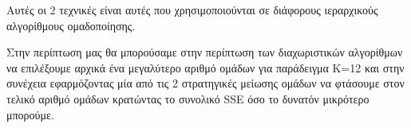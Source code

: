 \begin{enumerate}
        Αυτές οι 2 τεχνικές είναι αυτές που χρησιμοποιούνται σε διάφορους ιεραρχικούς αλγορίθμους ομαδοποίησης. 
        
        Στην περίπτωση μας θα μπορούσαμε στην περίπτωση των διαχωριστικών αλγορίθμων να επιλέξουμε αρχικά ένα μεγαλύτερο αριθμό ομάδων για παράδειγμα Κ=12 και στην συνέχεια εφαρμόζοντας μία από τις 2 στρατηγικές μείωσης ομάδων να φτάσουμε στον τελικό αριθμό ομάδων κρατώντας το συνολικό SSE όσο το δυνατόν μικρότερο μπορούμε.
\end{enumerate}
